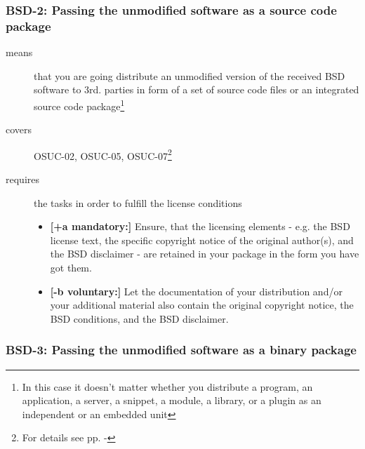 \subsubsection{BSD-2: Passing the unmodified software as a source code package}
\label{OSUC-02-BSD} \label{OSUC-05-BSD} \label{OSUC-07-BSD} 

\begin{description}
\item[means] that you are going distribute an unmodified version of the received
BSD software to 3rd. parties in form of a set of source code files or an
integrated source code package\footnote{In this case it doesn't matter whether
you  distribute a program, an application, a server, a snippet, a module, a
library, or a plugin as an independent or an embedded unit} 

\item[covers] OSUC-02, OSUC-05, OSUC-07\footnote{For details see pp.
\pageref{OSUC-02-DEF} - \pageref{OSUC-07-DEF}}

\item[requires] the tasks in order to fulfill the license conditions
\begin{itemize}
  \item \textbf{[+a mandatory:]} Ensure, that the licensing elements - e.g.
  the BSD license text, the specific copyright notice of the original author(s),
  and the BSD disclaimer - are retained in your package in the form you have got
  them.
  \item \textbf{[-b voluntary:]} Let the documentation of your distribution
  and/or your additional material also contain the original copyright notice, the
  BSD conditions, and the BSD disclaimer.
\end{itemize}
\end{description}

\subsubsection{BSD-3: Passing the unmodified software as a binary package}

